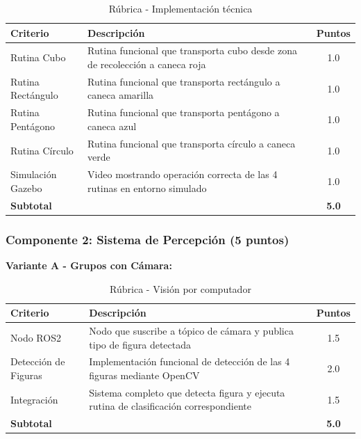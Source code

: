 \begin{table}[H]
\centering
\caption{Rúbrica - Implementación técnica}
\label{tab:rubrica_tecnica}
\footnotesize
\begin{tabular}{|l|p{10cm}|c|}
\hline
\textbf{Criterio} & \textbf{Descripción} & \textbf{Puntos} \\
\hline
Rutina Cubo & Rutina funcional que transporta cubo desde zona de recolección a caneca roja & 1.0 \\
\hline
Rutina Rectángulo & Rutina funcional que transporta rectángulo a caneca amarilla & 1.0 \\
\hline
Rutina Pentágono & Rutina funcional que transporta pentágono a caneca azul & 1.0 \\
\hline
Rutina Círculo & Rutina funcional que transporta círculo a caneca verde & 1.0 \\
\hline
Simulación Gazebo & Video mostrando operación correcta de las 4 rutinas en entorno simulado & 1.0 \\
\hline
\textbf{Subtotal} & & \textbf{5.0} \\
\hline
\end{tabular}
\end{table}

\subsubsection{Componente 2: Sistema de Percepción (5 puntos)}

\textbf{Variante A - Grupos con Cámara:}

\begin{table}[H]
\centering
\caption{Rúbrica - Visión por computador}
\label{tab:rubrica_vision}
\footnotesize
\begin{tabular}{|l|p{10cm}|c|}
\hline
\textbf{Criterio} & \textbf{Descripción} & \textbf{Puntos} \\
\hline
Nodo ROS2 & Nodo que suscribe a tópico de cámara y publica tipo de figura detectada & 1.5 \\
\hline
Detección de Figuras & Implementación funcional de detección de las 4 figuras mediante OpenCV & 2.0 \\
\hline
Integración & Sistema completo que detecta figura y ejecuta rutina de clasificación correspondiente & 1.5 \\
\hline
\textbf{Subtotal} & & \textbf{5.0} \\
\hline
\end{tabular}
\end{table}

